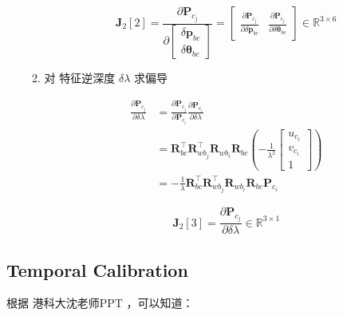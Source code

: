 \documentclass[12pt,a4paper]{article}
\begin{document}
\begin{enumerate}
\begin{enumerate}
\begin{equation}
\mathbf{J}_2[2] =
\frac{\partial \mathbf{P}_{c_{j}}}
{\partial\left[\begin{array}{c}{\delta \mathbf{p}_{bc}} \\ 
{\delta \boldsymbol{\theta}_{bc}}\end{array}\right]} =
\begin{bmatrix}
\frac{\partial \mathbf{P}_{c_{j}}}{\partial \delta \mathbf{p}_{bc}} &
\frac{\partial \mathbf{P}_{c_{j}}}{\partial \delta \boldsymbol{\theta}_{bc}} 
\end{bmatrix}
\in \mathbb{R}^{3 \times 6}
\end{equation}

\item 对 {\color{blue}特征逆深度 $\delta \lambda$} 求偏导

\begin{equation}
\begin{aligned} 
\frac{\partial \mathbf{P}_{c_{j}}}{\partial \delta \lambda} 
&=
\frac{\partial \mathbf{P}_{c_{j}}}{\partial \mathbf{P}_{c_{i}}} 
\frac{\partial \mathbf{P}_{c_{i}}}{\partial \delta \lambda} \\ 
&=
\mathbf{R}_{b c}^{\top} \mathbf{R}_{w b_{j}}^{\top} \mathbf{R}_{w b_{i}} \mathbf{R}_{b c}
\left(-\frac{1}{\lambda^{2}}
\left[\begin{array}{c}{u_{c_{i}}} \\ {v_{c_{i}}} \\ {1}\end{array}\right]\right) \\ 
&=
-\frac{1}{\lambda} \mathbf{R}_{b c}^{\top} \mathbf{R}_{w b_{j}}^{\top} \mathbf{R}_{w b_{i}} \mathbf{R}_{b c} \mathbf{P}_{c_{i}} 
\end{aligned}
\end{equation}

\begin{equation}
\mathbf{J}_2[3] =
\frac{\partial \mathbf{P}_{c_{j}}}{\partial \delta \lambda}
\in \mathbb{R}^{3 \times 1}
\end{equation}

\end{enumerate}

\end{enumerate}

\subsection{Temporal Calibration}

根据 港科大沈老师PPT \cite{shen2018vinsslide}，可以知道：
\end{document}
